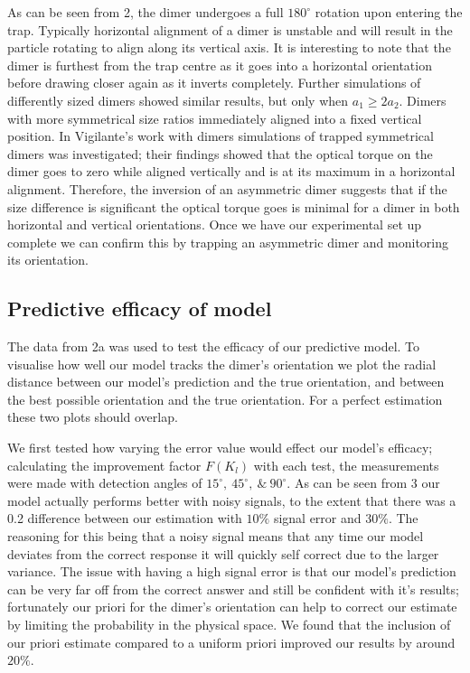 \documentclass[final,3p, twocolumn]{elsarticle}
\begin{document}
As can be seen from \figurename{ 2}, the dimer undergoes a full $180^{\circ}$ rotation upon entering the trap. Typically horizontal alignment of a dimer is unstable and will result in the particle rotating to align along its vertical axis. It is interesting to note that the dimer is furthest from the trap centre as it goes into a horizontal orientation before drawing closer again as it inverts completely. Further simulations of differently sized dimers showed similar results, but only when $a_1 \geq 2a_2$. Dimers with more symmetrical size ratios immediately aligned into a fixed vertical position. 
In Vigilante's work with dimers \cite{Vigilante2020Brownian_OT} simulations of trapped symmetrical dimers was investigated; their findings showed that the optical torque on the dimer goes to zero while aligned vertically and is at its maximum in a horizontal alignment. Therefore, the inversion of an asymmetric dimer suggests that if the size difference is significant the optical torque goes is minimal for a dimer in both horizontal and vertical orientations. Once we have our experimental set up complete we can confirm this by trapping an asymmetric dimer and monitoring its orientation. 

\subsection{Predictive efficacy of model}
\label{3.2}
The data from \figurename{ 2a} was used to test the efficacy of our predictive model. To visualise how well our model tracks the dimer's orientation we plot the radial distance between our model's prediction and the true orientation, and between the best possible orientation and the true orientation. For a perfect estimation these two plots should overlap. 

We first tested how varying the error value would effect our model's efficacy; calculating the improvement factor $F(K_l)$ with each test, the measurements were made with detection angles of $15^{\circ}, \ 45^{\circ}, \ \& \ 90^{\circ}$. As can be seen from \figurename{ 3} our model actually performs better with noisy signals, to the extent that there was a 0.2 difference between our estimation with $10 \%$ signal error and $30\%$. The reasoning for this being that a noisy signal means that any time our model deviates from the correct response it will quickly self correct due to the larger variance.  The issue with having a high signal error is that our model's prediction can be very far off from the correct answer and still be confident with it's results; fortunately our priori for the dimer's orientation can help to correct our estimate by limiting the probability in the physical space. We found that the inclusion of our priori estimate compared to a uniform priori improved our results by around $20 \%$. 
\end{document}
